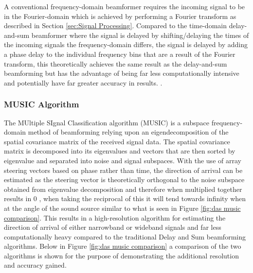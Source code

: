 \documentclass{UoNMCHA}
\numberwithin{equation}{section}
\begin{document}
    A conventional frequency-domain beamformer requires the incoming signal to be in the Fourier-domain which is achieved by performing a Fourier transform as described in Section \ref{sec:Signal Processing}. Compared to the time-domain delay-and-sum beamformer where the signal is delayed by shifting/delaying the times of the incoming signals the frequency-domain differs, the signal is delayed by adding a phase delay to the individual frequency bins that are a result of the Fourier transform, this theoretically achieves the same result as the delay-and-sum beamforming but has the advantage of being far less computationally intensive and potentially have far greater accuracy in results. \citep{Kri13}.

\subsubsection{MUSIC Algorithm} \label{sec:Intro MUSIC}
    The MUltiple SIgnal Classification algorithm (MUSIC) is a subspace frequency-domain method of beamforming relying upon an eigendecomposition of the spatial covariance matrix of the received signal data. The spatial covariance matrix is decomposed into its eigenvalues and vectors that are then sorted by eigenvalue and separated into noise and signal subspaces.
    With the use of array steering vectors based on phase rather than time, the direction of arrival can be estimated as the steering vector is theoretically orthogonal to the noise subspace obtained from eigenvalue decomposition and therefore when multiplied together results in 0 \citep{Pau} \citep{MatL}, when taking the reciprocal of this it will tend towards infinity when at the angle of the sound source similar to what is seen in Figure \ref{fig:das music comparison}. This results in a high-resolution algorithm for estimating the direction of arrival of either narrowband or wideband signals and far less computationally heavy compared to the traditional Delay and Sum beamforming algorithms. Below in Figure \ref{fig:das music comparison} a comparison of the two algorithms is shown for the purpose of demonstrating the additional resolution and accuracy gained. 

\end{document}
